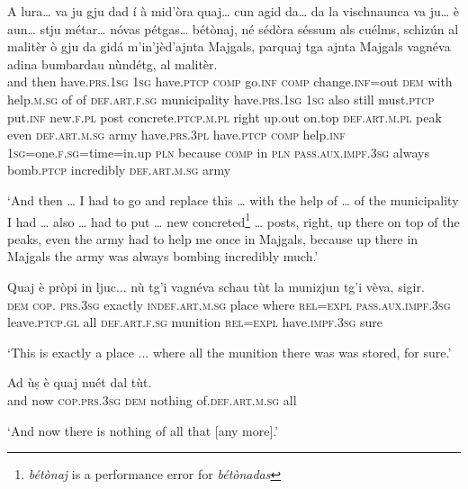 \begin{linenumbers}
\gll  A lura… va ju gju dad í à mid’òra quaj… cun agid da… da la vischnaunca va ju… è aun… stju métar… nóvas pétgas… bétònaj, né sédòra séssum als cuélms, schizún al malitèr ò gju da gidá m’in’jèd’ajnta Majgals, parquaj tga ajnta Majgals vagnéva adina bumbardau nùndétg, al malitèr.\\
and then have.\textsc{prs.1sg} \textsc{1sg} have.\textsc{ptcp} \textsc{comp} go.\textsc{inf}  \textsc{comp} change.\textsc{inf=}out \textsc{dem} with help.\textsc{m.sg} of of  \textsc{def.art.f.sg} municipality have.\textsc{prs.1sg} \textsc{1sg} also still must.\textsc{ptcp} put.\textsc{inf}  new.\textsc{f.pl}  post concrete.\textsc{ptcp.m.pl} right up.out  on.top \textsc{def.art.m.pl} peak even \textsc{def.art.m.sg} army have.\textsc{prs.3pl} have.\textsc{ptcp} \textsc{comp} help.\textsc{inf}  \textsc{1sg=}one.\textsc{f.sg=}time=in.up \textsc{pln} because \textsc{comp} in \textsc{pln} \textsc{pass.aux.impf.3sg} always bomb.\textsc{ptcp} incredibly \textsc{def.art.m.sg} army \\
\end{linenumbers}
\medskip
\glt `And then … I had to go and replace this … with the help of … of the municipality I had … also … had to put … new concreted\footnote{\textit{bétònaj} is a performance error for \textit{bétònadas}} … posts, right, up there on top of the peaks, even the army had to help me once in Majgals, because up there in Majgals the army was always bombing incredibly much.'
\medskip

\begin{linenumbers}
\gll  Quaj è pròpi in ljuc... nù tg’i vagnéva schau tùt la munizjun tg’i vèva, sigir.  \\
 \textsc{dem} \textsc{cop. prs.3sg} exactly \textsc{indef.art.m.sg} place where \textsc{rel=expl} \textsc{pass.aux.impf.3sg} leave.\textsc{ptcp.gl} all \textsc{def.art.f.sg} munition \textsc{rel=expl} have.\textsc{impf.3sg} sure \\
\end{linenumbers}
\medskip
\glt `This is exactly a place ... where all the munition there was was stored, for sure.'
\medskip

\begin{linenumbers}
\gll  Ad ùṣ è quaj nuét dal tùt.   \\
and now \textsc{cop.prs.3sg} \textsc{dem} nothing of.\textsc{def.art.m.sg} all  \\
\end{linenumbers}
\medskip
\glt `And now there is nothing of all that [any more].'
\medskip

